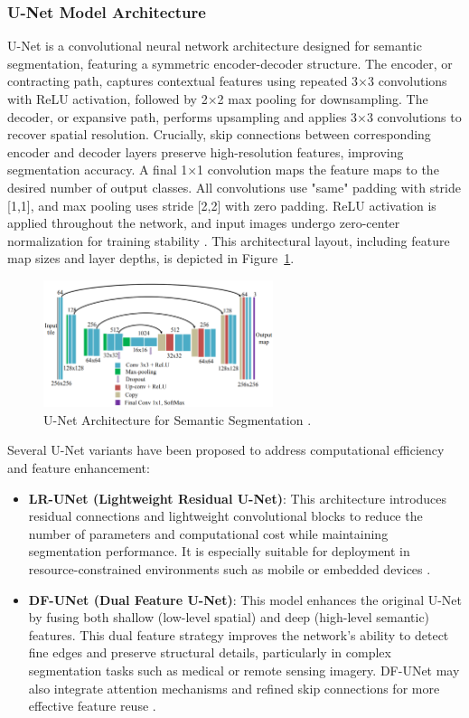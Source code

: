 \subsubsection{U-Net Model Architecture}
U-Net is a convolutional neural network architecture designed for semantic segmentation, featuring a symmetric encoder-decoder structure. The encoder, or contracting path, captures contextual features using repeated 3×3 convolutions with ReLU activation, followed by 2×2 max pooling for downsampling. The decoder, or expansive path, performs upsampling and applies 3×3 convolutions to recover spatial resolution. Crucially, skip connections between corresponding encoder and decoder layers preserve high-resolution features, improving segmentation accuracy. A final 1×1 convolution maps the feature maps to the desired number of output classes. All convolutions use "same" padding with stride [1,1], and max pooling uses stride [2,2] with zero padding. ReLU activation is applied throughout the network, and input images undergo zero-center normalization for training stability \parencite{su2020aerial}. This architectural layout, including feature map sizes and layer depths, is depicted in Figure~\ref{fig:U-Net}.
\begin{figure}[H] %
    \centering
    \includegraphics[width=0.6\textwidth]{chapters/chapter1/images/Figure21.png}
    \caption{U-Net Architecture for Semantic Segmentation \parencite{su2020aerial}.}
    \label{fig:U-Net}
\end{figure}
Several U-Net variants have been proposed to address computational efficiency and feature enhancement:
\begin{itemize}
    \item \textbf{LR-UNet (Lightweight Residual U-Net)}: This architecture introduces residual connections and lightweight convolutional blocks to reduce the number of parameters and computational cost while maintaining segmentation performance. It is especially suitable for deployment in resource-constrained environments such as mobile or embedded devices \parencite{zhang2021irunet}.
    
    \item \textbf{DF-UNet (Dual Feature U-Net)}: This model enhances the original U-Net by fusing both shallow (low-level spatial) and deep (high-level semantic) features. This dual feature strategy improves the network's ability to detect fine edges and preserve structural details, particularly in complex segmentation tasks such as medical or remote sensing imagery. DF-UNet may also integrate attention mechanisms and refined skip connections for more effective feature reuse \parencite{zhang2022wheat}.
\end{itemize}

